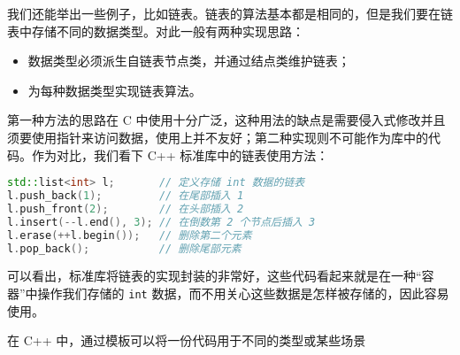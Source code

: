 我们还能举出一些例子，比如链表。链表的算法基本都是相同的，但是我们要在链表中存储不同的数据类型。对此一般有两种实现思路：
\begin{itemize}
  \item 数据类型必须派生自链表节点类，并通过结点类维护链表；
  \item 为每种数据类型实现链表算法。
\end{itemize}
第一种方法的思路在 C 中使用十分广泛，这种用法的缺点是需要侵入式修改并且须要使用指针来访问数据，使用上并不友好；第二种实现则不可能作为库中的代码。作为对比，我们看下 C++ 标准库中的链表使用方法：
\begin{lstlisting}[language=c++]
std::list<int> l;       // 定义存储 int 数据的链表
l.push_back(1);         // 在尾部插入 1
l.push_front(2);        // 在头部插入 2
l.insert(--l.end(), 3); // 在倒数第 2 个节点后插入 3
l.erase(++l.begin());   // 删除第二个元素
l.pop_back();           // 删除尾部元素
\end{lstlisting}
可以看出，标准库将链表的实现封装的非常好，这些代码看起来就是在一种``容器''中操作我们存储的 \texttt{int} 数据，而不用关心这些数据是怎样被存储的，因此容易使用。

在 C++ 中，通过模板可以将一份代码用于不同的类型或某些场景
